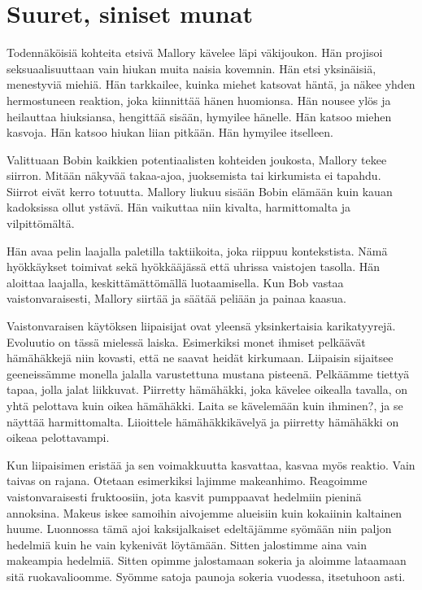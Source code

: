 \section{Suuret, siniset munat}

Todennäköisiä kohteita etsivä Mallory kävelee läpi väkijoukon. Hän projisoi seksuaalisuuttaan vain hiukan muita naisia kovemnin. Hän etsi yksinäisiä, menestyviä miehiä. Hän tarkkailee, kuinka miehet katsovat häntä, ja näkee yhden hermostuneen reaktion, joka kiinnittää hänen huomionsa. Hän nousee ylös ja heilauttaa hiuksiansa, hengittää sisään, hymyilee hänelle. Hän katsoo miehen kasvoja. Hän katsoo hiukan liian pitkään. Hän hymyilee itselleen.

Valittuaan Bobin kaikkien potentiaalisten kohteiden joukosta, Mallory tekee siirron. Mitään näkyvää takaa-ajoa, juoksemista tai kirkumista ei tapahdu. Siirrot eivät kerro totuutta. Mallory liukuu sisään Bobin elämään kuin kauan kadoksissa ollut ystävä. Hän vaikuttaa niin kivalta, harmittomalta ja vilpittömältä.

Hän avaa pelin laajalla paletilla taktiikoita, joka riippuu kontekstista. Nämä hyökkäykset toimivat sekä hyökkääjässä että uhrissa vaistojen tasolla. Hän aloittaa laajalla, keskittämättömällä luotaamisella. Kun Bob vastaa vaistonvaraisesti, Mallory siirtää ja säätää peliään ja painaa kaasua.

Vaistonvaraisen käytöksen liipaisijat ovat yleensä yksinkertaisia karikatyyrejä. Evoluutio on tässä mielessä laiska. Esimerkiksi monet ihmiset pelkäävät hämähäkkejä niin kovasti, että ne saavat heidät kirkumaan. Liipaisin sijaitsee geeneissämme monella jalalla varustettuna mustana pisteenä. Pelkäämme tiettyä tapaa, jolla jalat liikkuvat. Piirretty hämähäkki, joka kävelee oikealla tavalla, on yhtä pelottava kuin oikea hämähäkki. Laita se kävelemään kuin ihminen?, ja se näyttää harmittomalta. Liioittele hämähäkkikävelyä ja piirretty hämähäkki on oikeaa pelottavampi.

Kun liipaisimen eristää ja sen voimakkuutta kasvattaa, kasvaa myös reaktio. Vain taivas on rajana. Otetaan esimerkiksi lajimme makeanhimo. Reagoimme vaistonvaraisesti fruktoosiin, jota kasvit pumppaavat hedelmiin pieninä annoksina. Makeus iskee samoihin aivojemme alueisiin kuin kokaiinin kaltainen huume. Luonnossa tämä ajoi kaksijalkaiset edeltäjämme syömään niin paljon hedelmiä kuin he vain kykenivät löytämään. Sitten jalostimme aina vain makeampia hedelmiä. Sitten opimme jalostamaan sokeria ja aloimme lataamaan sitä ruokavalioomme. Syömme satoja paunoja sokeria vuodessa, itsetuhoon asti.

